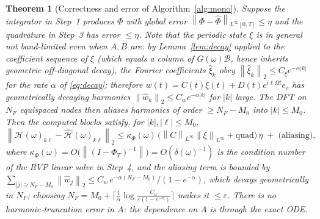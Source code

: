\documentclass{amsart}
\newtheorem{theorem}{Theorem}
\theoremstyle{definition}
\newcommand{\norm}[1]{\left\lVert#1\right\rVert}
\newcommand{\Bcal}{\mathcal{B}}
\newcommand{\Hcal}{\mathcal{H}}
\begin{document}
\begin{theorem}[Correctness and error of Algorithm~\ref{alg:mono}]\label{thm:mono}
Suppose the integrator in Step~1 produces $\Phi$ with global error
$\norm{\Phi-\hat\Phi}_{L^\infty[0,T]}\le\eta$ and the quadrature in Step~3 has
error $\le\eta$. Note that the periodic state $\xi$ is in general \emph{not}
band-limited even when $A,B$ are: by Lemma~\ref{lem:decay} applied to the
coefficient sequence of $\xi$ (which equals a column of $G(\omega)\Bcal$, hence
inherits geometric off-diagonal decay), the Fourier coefficients $\hat\xi_k$
obey $\norm{\hat\xi_k}_2\le C_\xi e^{-\alpha|k|}$ for the rate $\alpha$ of
\eqref{eq:decay}; therefore $w(t)=C(t)\xi(t)+D(t)e^{i\ell\Omega t}e_c$ has
geometrically decaying harmonics $\norm{\hat w_k}_2\le C_w e^{-\alpha|k|}$ for
$|k|$ large. The DFT on $N_F$ equispaced nodes then aliases harmonics of order
$\ge N_F-M_0$ into $|k|\le M_0$. Then the
computed blocks satisfy, for $|k|,|\ell|\le M_0$,
\begin{equation}\label{eq:monoerr}
\norm{\Hcal(\omega)_{k\ell}-\widehat{\Hcal}(\omega)_{k\ell}}_2
\le \kappa_\Phi(\omega)\,\big(\norm{C}_{L^\infty}\norm{\xi}_{L^\infty}+\text{quad}\big)\,\eta
\;+\;\text{(aliasing)},
\end{equation}
where $\kappa_\Phi(\omega)=O\!\big(\norm{(I-\Phi_T)^{-1}}\big)
=O(\delta(\omega)^{-1})$ is the condition number of the BVP linear solve in
Step~4, and the aliasing term is bounded by
$\sum_{|j|\ge N_F-M_0}\norm{\hat w_j}_2\le C_w\,e^{-\alpha(N_F-M_0)}/(1-e^{-\alpha})$,
which decays geometrically in $N_F$; choosing
$N_F=M_0+\lceil\tfrac1\alpha\log\tfrac{C_w}{\varepsilon(1-e^{-\alpha})}\rceil$
makes it $\le\varepsilon$. There is \emph{no} harmonic-truncation error in $A$:
the dependence on $A$ is through the exact ODE.
\end{theorem}
\end{document}
